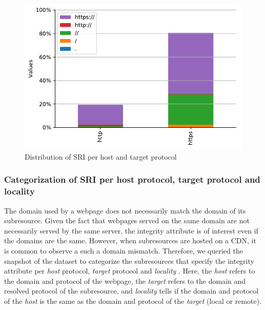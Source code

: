 \documentclass[sigconf,table]{acmart}
\begin{document}
\begin{figure}[h]
	\includegraphics[width=\columnwidth]{../../notebooks/06_sri_per_host_and_target_protocol}
	\caption{Distribution of SRI per host and target protocol}
	\label{fig:06}
\end{figure}


\subsubsection{Categorization of SRI per host protocol, target protocol and locality}

The domain used by a webpage does not necessarily match the domain of its subresource.
Given the fact that webpages served on the same domain are not necessarily served by the same server, the integrity attribute is of interest even if the domains are the same.
However, when subresources are hosted on a CDN, it is common to observe a  such a domain mismatch.
Therefore, we queried the \CCSnapshotLatest snapshot of the \CCSRI dataset to categorize the subresources that specify the integrity attribute per \textit{host} protocol, \textit{target} protocol and \textit{locality} .
Here, the \textit{host} refers to the domain and protocol of the webpage, the \textit{target} refers to the domain and resolved protocol of the subresource, and \textit{locality} tells if the domain and protocol of the \textit{host} is the same as the domain and protocol of the \textit{target} (local or remote).
\end{document}
